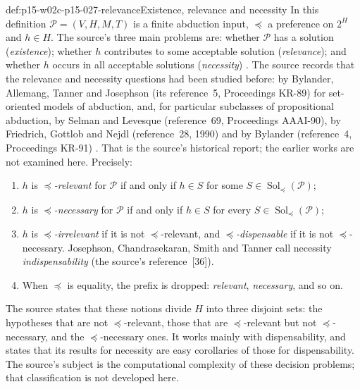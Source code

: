 \begin{hbdefinition}{def:p15-w02c-p15-027-relevance}{Existence, relevance and necessity}
In this definition \(\mathcal P=(V,H,M,T)\) is a finite abduction input,
\(\preceq\) a preference on \(2^H\) and \(h\in H\). The source's three main problems
are: whether \(\mathcal P\) has a solution (\emph{existence}); whether
\(h\) contributes to some acceptable solution (\emph{relevance}); and
whether \(h\) occurs in all acceptable solutions (\emph{necessity})
\cite[def.~2.5 and the preceding list, manuscript p.~11]{EiterGottlobAbductionManuscript}.
The source records that the relevance and necessity questions had been
studied before: by Bylander, Allemang, Tanner and Josephson (its
reference~5, Proceedings KR-89) for set-oriented models of abduction,
and, for particular subclasses of propositional abduction, by Selman and
Levesque (reference~69, Proceedings AAAI-90), by Friedrich, Gottlob and
Nejdl (reference~28, 1990) and by Bylander (reference~4, Proceedings
KR-91)
\cite[manuscript p.~11, and reference list, manuscript pp.~41, 42 and~45]{EiterGottlobAbductionManuscript}.
That is the source's historical report; the earlier works are not
examined here.
Precisely:
\begin{enumerate}
\item \(h\) is \emph{\(\preceq\)-relevant} for \(\mathcal P\) if and only
      if \(h\in S\) for some \(S\in\operatorname{Sol}_{\preceq}(\mathcal P)\);
\item \(h\) is \emph{\(\preceq\)-necessary} for \(\mathcal P\) if and only
      if \(h\in S\) for every \(S\in\operatorname{Sol}_{\preceq}(\mathcal P)\);
\item \(h\) is \emph{\(\preceq\)-irrelevant} if it is not
      \(\preceq\)-relevant, and \emph{\(\preceq\)-dispensable} if it is not
      \(\preceq\)-necessary. Josephson, Chandrasekaran, Smith and Tanner
      call necessity \emph{indispensability} (the source's reference~[36]).
\item When \(\preceq\) is equality, the prefix is dropped: \emph{relevant},
      \emph{necessary}, and so on.
\end{enumerate}
The source states that these notions divide \(H\) into three disjoint
sets: the hypotheses that are not \(\preceq\)-relevant, those that are
\(\preceq\)-relevant but not \(\preceq\)-necessary, and the
\(\preceq\)-necessary ones. It works mainly with dispensability, and
states that its results for necessity are easy corollaries of those for
dispensability. The source's subject is the computational complexity of
these decision problems; that classification is not developed here.
\end{hbdefinition}

